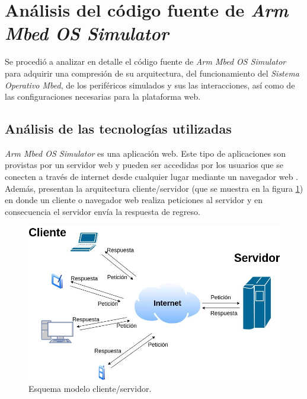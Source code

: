 \section{Análisis del código fuente de \textit{Arm Mbed OS Simulator}}

Se procedió a analizar en detalle el código fuente de \textit{Arm Mbed OS Simulator} para adquirir una compresión de su arquitectura, del funcionamiento del \textit{Sistema Operativo Mbed}, de los periféricos simulados y sus las interacciones, así como de las configuraciones necesarias para la plataforma web.

\subsection{Análisis de las tecnologías utilizadas}

\textit{Arm Mbed OS Simulator} es una aplicación web. Este tipo de aplicaciones son provistas por un servidor web y pueden ser accedidas por los usuarios que se conecten a través de internet desde cualquier lugar mediante un navegador web \citep{NavegadorWeb}. Además, presentan la arquitectura cliente/servidor (que se muestra en la figura \ref{fig:ClienteServidor}) en donde un cliente o navegador web realiza peticiones al servidor y en consecuencia el servidor envía la respuesta de regreso.

\begin{figure}[ht]
	\centering
	\includegraphics[scale=.48]{./Figures/EsquemaCliente_Servidor.jpg}
	\caption{Esquema modelo cliente/servidor.}
	\label{fig:ClienteServidor}
\end{figure}

